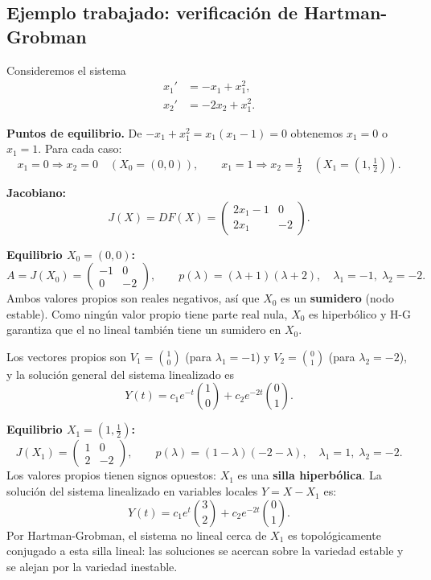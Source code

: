 \documentclass[11pt,letterpaper]{article}
\begin{document}
\subsection{Ejemplo trabajado: verificación de Hartman-Grobman}

Consideremos el sistema
\begin{align*}
x_1' &= -x_1 + x_1^2,\\
x_2' &= -2x_2 + x_1^2.
\end{align*}

\textbf{Puntos de equilibrio.} De $-x_1+x_1^2=x_1(x_1-1)=0$ obtenemos
$x_1=0$ o $x_1=1$. Para cada caso:
\[
x_1=0 \Rightarrow x_2=0 \quad (X_0=(0,0)),\qquad
x_1=1 \Rightarrow x_2=\tfrac{1}{2} \quad (X_1=(1,\tfrac{1}{2})).
\]

\textbf{Jacobiano:}
\[
J(X)=DF(X)=\begin{pmatrix}2x_1-1 & 0\\ 2x_1 & -2\end{pmatrix}.
\]

\textbf{Equilibrio $X_0=(0,0)$:}
\[
A=J(X_0)=\begin{pmatrix}-1 & 0\\ 0 & -2\end{pmatrix},\qquad
p(\lambda)=(\lambda+1)(\lambda+2),\quad \lambda_1=-1,\;\lambda_2=-2.
\]
Ambos valores propios son reales negativos, así que $X_0$ es un \textbf{sumidero}
(nodo estable). Como ningún valor propio tiene parte real nula, $X_0$ es
hiperbólico y H-G garantiza que el no lineal también tiene un sumidero en $X_0$.

Los vectores propios son $V_1=\binom{1}{0}$ (para $\lambda_1=-1$)
y $V_2=\binom{0}{1}$ (para $\lambda_2=-2$), y la solución general del sistema
linealizado es
\[
Y(t)=c_1 e^{-t}\binom{1}{0}+c_2 e^{-2t}\binom{0}{1}.
\]

\textbf{Equilibrio $X_1=(1,\frac{1}{2})$:}
\[
J(X_1)=\begin{pmatrix}1 & 0\\ 2 & -2\end{pmatrix},\qquad
p(\lambda)=(1-\lambda)(-2-\lambda),\quad \lambda_1=1,\;\lambda_2=-2.
\]
Los valores propios tienen signos opuestos: $X_1$ es una \textbf{silla hiperbólica}.
La solución del sistema linealizado en variables locales $Y=X-X_1$ es:
\[
Y(t)=c_1 e^{t}\binom{3}{2}+c_2 e^{-2t}\binom{0}{1}.
\]
Por Hartman-Grobman, el sistema no lineal cerca de $X_1$ es topológicamente
conjugado a esta silla lineal: las soluciones se acercan sobre la variedad
estable y se alejan por la variedad inestable.
\end{document}
